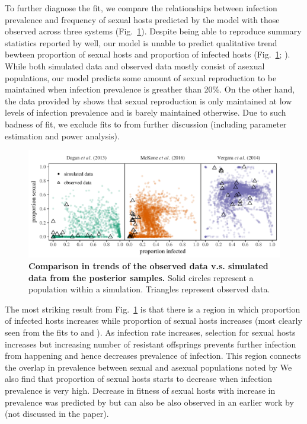 \documentclass{article}\usepackage[]{graphicx}\usepackage[]{color}
\newcommand{\fref}[1]{Fig.~\ref{fig:#1}}
\begin{document}
To further diagnose the fit, we compare the relationships between infection prevalence and frequency of sexual hosts predicted by the model with those observed across three systems (\fref{ivs}).
Despite being able to reproduce summary statistics reported by \cite{dagan2013clonal} well, 
our model is unable to predict qualitative trend bewteen proportion of sexual hosts and proportion of infected hosts (\fref{ivs}; \cite{dagan2013clonal}).
While both simulated data and observed data mostly consist of asexual populations,
our model predicts some amount of sexual reproduction to be maintained when infection prevalence is greather than 20\%. 
On the other hand, the data provided by \cite{dagan2013clonal} shows that sexual reproduction is only maintained at low levels of infection prevalence and is barely maintained otherwise.
Due to such badness of fit, we exclude fits to \cite{dagan2013clonal} from further discussion (including parameter estimation and power analysis).

\begin{figure}[!htp]
\includegraphics[width=\textwidth]{../fig/simulated_data.pdf}
\caption{{\bf Comparison in trends of the observed data v.s. simulated data from the posterior samples.}
Solid circles represent a population within a simulation. Triangles represent observed data.}
\label{fig:ivs}
\end{figure}

The most striking result from \fref{ivs} is that there is a region in which proportion of infected hosts increases while proportion of sexual hosts increases (most clearly seen from the fits to \cite{mckone2016fine} and \cite{vergara2014infection}). %
As infection rate increases, selection for sexual hosts increases but increasing number of resistant offsprings prevents further infection from happening and hence decreases prevalence of infection.
This region connects the overlap in prevalence between sexual and asexual populations noted by \cite{lively2001trematode}
We also find that proportion of sexual hosts starts to decrease when infection prevalence is very high.
Decrease in fitness of sexual hosts with increase in prevalence was predicted by \cite{ashby2015diversity} but can also be also observed in an earlier work by \cite{lively2010epidemiological} (not discussed in the paper).
\end{document}
